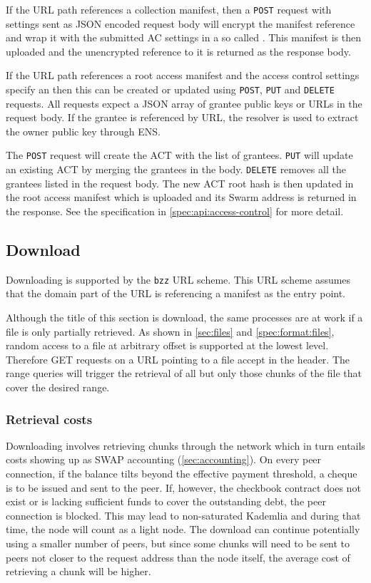 If the URL path references a collection manifest, then a \lstinline{POST} request with  settings sent as JSON encoded request body will encrypt the manifest reference and wrap it with the submitted AC settings in a so called . This manifest is then uploaded and the unencrypted reference to it is returned as the response body. 

If the URL path references a root access manifest and the access control settings specify an  then this can be created or updated using \lstinline{POST}, \lstinline{PUT} and \lstinline{DELETE} requests. All requests expect a JSON array of grantee public keys or URLs in the request body. If the grantee is referenced by URL, the resolver is used to extract the owner public key through ENS.

The \lstinline{POST} request will create the ACT with the list of grantees. \lstinline{PUT} will update an existing ACT by merging the grantees in the body. \lstinline{DELETE} removes all the grantees listed in the request body. The new ACT root hash is then updated in the root access manifest which is uploaded and its Swarm address is returned in the response. See the specification in  \ref{spec:api:access-control} for more detail.



\subsection{Download \statusgreen}\label{sec:download}

Downloading is supported by the \lstinline{bzz} URL scheme. This URL scheme assumes that the domain part of the URL is referencing a manifest as the entry point. 

Although the title of this section is download, the same  processes are at work if a file is only partially retrieved. As shown in \ref{sec:files} and \ref{spec:format:files}, random access to a file at arbitrary offset is supported at the lowest level. Therefore GET requests on a URL pointing to a file accept  in the header. The range queries will trigger the retrieval of all but only those chunks of the file that cover the desired range.  

\subsubsection{Retrieval costs}

Downloading involves retrieving chunks through the network which in turn entails costs showing up as SWAP accounting (\ref{sec:accounting}). On every peer connection, if the balance tilts beyond the effective payment threshold, a cheque is to be issued and sent to the peer. If, however, the checkbook contract does not exist or is lacking sufficient funds to cover the outstanding debt, the peer connection is blocked. This may lead to non-saturated Kademlia and during that time, the node will count as a light node. The download can continue potentially using a smaller number of peers, but since some chunks will need to be sent to peers not closer to the request address than the node itself, the average cost of retrieving a chunk will be higher. 


